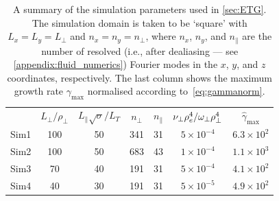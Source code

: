 \documentclass{jpp}
\newcommand{\omegaperp}{\omega_\perp}
\begin{document}
\begin{table}
	\centering
	\begin{tabular}{l  c  c  c  c  c  c}
		\vspace{1.5mm}
		& $L_\perp/\rho_\perp$ & $L_\parallel \sqrt{\sigma}/L_T$ & $n_\perp$ & $n_\parallel$ & $\nu_\perp \rhoe^4 / \omegaperp\rho_\perp^4$ & \(\hat{\gamma}_\text{max}\) \\
		Sim1 & 100 & 50 & 341 & 31 & \(5 \times 10^{-4}\) & \(6.3\times 10^2\) \\
		Sim2 & 100 & 50 & 683 & 43 & \(1 \times 10^{-4}\) & \(1.1\times 10^3\) \\
		Sim3 & 70 & 40 & 191 & 31 & \(5 \times 10^{-4}\) & \(4.1\times 10^2\) \\
		Sim4 & 40 & 30 & 191 & 31 & \(5 \times 10^{-5}\) & \(4.9\times 10^2\) \\
	\end{tabular}
	\caption{A summary of the simulation parameters used in \cref{sec:ETG}. The simulation domain is taken to be `square' with \mbox{\(L_x = L_y = L_\perp\)} and \(n_x = n_y = n_\perp\), where \(n_x\), \(n_y\), and \(n_\parallel\) are the number of resolved (i.e., after dealiasing --- see \cref{appendix:fluid_numerics}) Fourier modes in the \(x\), \(y\), and \(z\) coordinates, respectively. The last column shows the maximum growth rate \(\gamma_\text{max}\) normalised according to~\cref{eq:gammanorm}. }
	\label{tab:sims}
\end{table}
\end{document}
